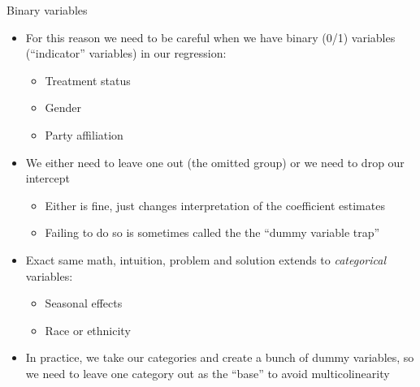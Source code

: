\documentclass[aspectratio=169]{beamer}
\begin{document}
\begin{frame}{Binary variables}
    \begin{itemize}
        \item For this reason we need to be careful when we have binary (0/1) variables (``indicator'' variables) in our regression:
        \begin{itemize}
            \item Treatment status
            \item Gender
            \item Party affiliation
        \end{itemize}
        \item We either need to leave one out (the omitted group) or we need to drop our intercept
        \begin{itemize}
            \item Either is fine, just changes interpretation of the coefficient estimates
            \item Failing to do so is sometimes called the the ``dummy variable trap''
        \end{itemize}

        \pause

        \item Exact same math, intuition, problem and solution extends to \textit{categorical} variables:
        \begin{itemize}
            \item Seasonal effects
            \item Race or ethnicity
        \end{itemize}
        \item In practice, we take our categories and create a bunch of dummy variables, so we need to leave one category out as the ``base'' to avoid multicolinearity
    \end{itemize}
\end{frame}
\end{document}
